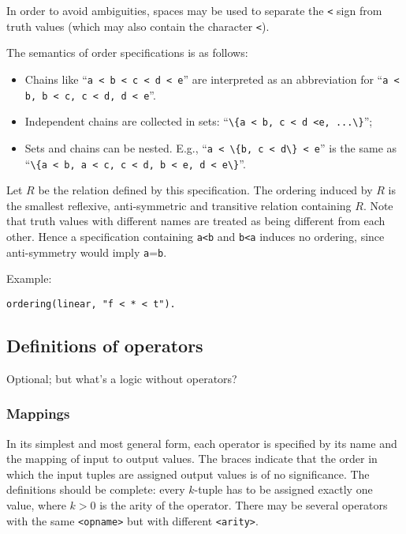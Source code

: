 \documentclass[]{article}
\newcommand{\passthrough}[1]{#1}
\providecommand{\tightlist}{%
  \setlength{\itemsep}{0pt}\setlength{\parskip}{0pt}}
\begin{document}
In order to avoid ambiguities, spaces may be used to separate the
\passthrough{\lstinline!<!} sign from truth values (which may also
contain the character \passthrough{\lstinline!<!}).

The semantics of order specifications is as follows:

\begin{itemize}
\tightlist
\item
  Chains like ``\passthrough{\lstinline!a < b < c < d < e!}'' are
  interpreted as an abbreviation for
  ``\passthrough{\lstinline!a < b, b < c, c < d, d < e!}''.
\item
  Independent chains are collected in sets:
  ``\passthrough{\lstinline!\{a < b, c < d <e, ...\}!}'';
\item
  Sets and chains can be nested. E.g.,
  ``\passthrough{\lstinline!a < \{b, c < d\} < e!}'' is the same as
  ``\passthrough{\lstinline!\{a < b, a < c, c < d, b < e, d < e\}!}''.
\end{itemize}

Let \(R\) be the relation defined by this specification. The ordering
induced by \(R\) is the smallest reflexive, anti-symmetric and
transitive relation containing \(R\). Note that truth values with
different names are treated as being different from each other. Hence a
specification containing \passthrough{\lstinline!a<b!} and
\passthrough{\lstinline!b<a!} induces no ordering, since anti-symmetry
would imply \passthrough{\lstinline!a!}=\passthrough{\lstinline!b!}.

Example:

\begin{lstlisting}
ordering(linear, "f < * < t").
\end{lstlisting}

\hypertarget{definitions-of-operators}{%
\subsection{Definitions of operators}\label{definitions-of-operators}}

Optional; but what's a logic without operators?

\hypertarget{mappings}{%
\subsubsection{Mappings}\label{mappings}}

In its simplest and most general form, each operator is specified by its
name and the mapping of input to output values. The braces indicate that
the order in which the input tuples are assigned output values is of no
significance. The definitions should be complete: every \(k\)-tuple has
to be assigned exactly one value, where \(k>0\) is the arity of the
operator. There may be several operators with the same
\passthrough{\lstinline!<opname>!} but with different
\passthrough{\lstinline!<arity>!}.
\end{document}

